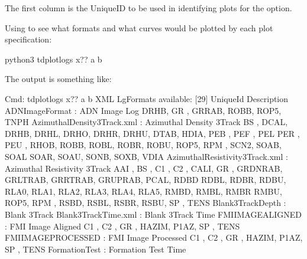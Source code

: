 \documentclass[letterpaper,10pt,english]{sphinxmanual}
\begin{document}
The first column is the UniqueID to be used in identifying plots for the  option.

Using  to see what formats and what curves would be plotted by each plot specification:

\begin{sphinxVerbatim}[commandchars=\\\{\}]
\PYGZdl{} python3 tdplotlogs \PYGZhy{}x?? a b
\end{sphinxVerbatim}

The output is something like:

\begin{sphinxVerbatim}[commandchars=\\\{\}]
Cmd: tdplotlogs \PYGZhy{}x?? a b
XML LgFormats available: [29]
UniqueId                              Description
\PYGZhy{}\PYGZhy{}\PYGZhy{}\PYGZhy{}\PYGZhy{}\PYGZhy{}\PYGZhy{}\PYGZhy{}\PYGZhy{}\PYGZhy{}\PYGZhy{}\PYGZhy{}\PYGZhy{}\PYGZhy{}\PYGZhy{}\PYGZhy{}\PYGZhy{}\PYGZhy{}\PYGZhy{}\PYGZhy{}\PYGZhy{}\PYGZhy{}\PYGZhy{}\PYGZhy{}\PYGZhy{}\PYGZhy{}\PYGZhy{}\PYGZhy{}\PYGZhy{}\PYGZhy{}\PYGZhy{}\PYGZhy{}\PYGZhy{}\PYGZhy{}\PYGZhy{}   \PYGZhy{}\PYGZhy{}\PYGZhy{}\PYGZhy{}\PYGZhy{}\PYGZhy{}\PYGZhy{}\PYGZhy{}\PYGZhy{}\PYGZhy{}\PYGZhy{}\PYGZhy{}\PYGZhy{}\PYGZhy{}\PYGZhy{}\PYGZhy{}\PYGZhy{}\PYGZhy{}\PYGZhy{}\PYGZhy{}\PYGZhy{}\PYGZhy{}\PYGZhy{}\PYGZhy{}\PYGZhy{}\PYGZhy{}\PYGZhy{}\PYGZhy{}\PYGZhy{}\PYGZhy{}\PYGZhy{}\PYGZhy{}
ADN\PYGZus{}Image\PYGZus{}Format                    : ADN Image Log
    DRHB, GR  , GR\PYGZus{}RAB, ROBB, ROP5, TNPH
Azimuthal\PYGZus{}Density\PYGZus{}3Track.xml        : Azimuthal Density 3Track
    BS  , DCAL, DRHB, DRHL, DRHO, DRHR, DRHU, DTAB, HDIA, PEB , PEF , PEL
    PER , PEU , RHOB, ROBB, ROBL, ROBR, ROBU, ROP5, RPM , SCN2, SOAB, SOAL
    SOAR, SOAU, SONB, SOXB, VDIA
Azimuthal\PYGZus{}Resistivity\PYGZus{}3Track.xml    : Azimuthal Resistivity 3Track
    AAI , BS  , C1  , C2  , CALI, GR  , GRDN\PYGZus{}RAB, GRLT\PYGZus{}RAB, GRRT\PYGZus{}RAB, GRUP\PYGZus{}RAB, PCAL, RDBD
    RDBL, RDBR, RDBU, RLA0, RLA1, RLA2, RLA3, RLA4, RLA5, RMBD, RMBL, RMBR
    RMBU, ROP5, RPM , RSBD, RSBL, RSBR, RSBU, SP  , TENS
Blank\PYGZus{}3Track\PYGZus{}Depth                  : Blank 3Track
Blank\PYGZus{}3Track\PYGZus{}Time.xml               : Blank 3Track Time
FMI\PYGZus{}IMAGE\PYGZus{}ALIGNED                   : FMI Image Aligned
    C1  , C2  , GR  , HAZIM, P1AZ, SP  , TENS
FMI\PYGZus{}IMAGE\PYGZus{}PROCESSED                 : FMI Image Processed
    C1  , C2  , GR  , HAZIM, P1AZ, SP  , TENS
Formation\PYGZus{}Test                      : Formation Test Time

\end{sphinxVerbatim}
\end{document}
